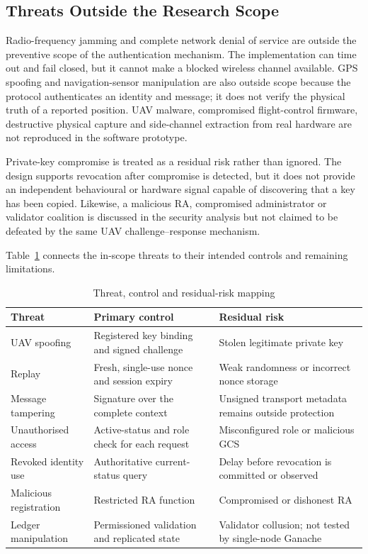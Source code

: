 \subsection{Threats Outside the Research Scope}
\label{subsec:out-of-scope-threats}

Radio-frequency jamming and complete network denial of service are outside the preventive scope of the authentication mechanism. The implementation can time out and fail closed, but it cannot make a blocked wireless channel available. GPS spoofing and navigation-sensor manipulation are also outside scope because the protocol authenticates an identity and message; it does not verify the physical truth of a reported position. UAV malware, compromised flight-control firmware, destructive physical capture and side-channel extraction from real hardware are not reproduced in the software prototype.

Private-key compromise is treated as a residual risk rather than ignored. The design supports revocation after compromise is detected, but it does not provide an independent behavioural or hardware signal capable of discovering that a key has been copied. Likewise, a malicious RA, compromised administrator or validator coalition is discussed in the security analysis but not claimed to be defeated by the same UAV challenge--response mechanism.

Table~\ref{tab:threat-control-map} connects the in-scope threats to their intended controls and remaining limitations.

\begin{table}[htbp]
    \centering
    \caption{Threat, control and residual-risk mapping}
    \label{tab:threat-control-map}
    \begin{tabular}{|p{}|p{}|p{}|}
        \hline
        \textbf{Threat} & \textbf{Primary control} & \textbf{Residual risk} \\
        \hline
        UAV spoofing & Registered key binding and signed challenge & Stolen legitimate private key \\
        \hline
        Replay & Fresh, single-use nonce and session expiry & Weak randomness or incorrect nonce storage \\
        \hline
        Message tampering & Signature over the complete context & Unsigned transport metadata remains outside protection \\
        \hline
        Unauthorised access & Active-status and role check for each request & Misconfigured role or malicious GCS \\
        \hline
        Revoked identity use & Authoritative current-status query & Delay before revocation is committed or observed \\
        \hline
        Malicious registration & Restricted RA function & Compromised or dishonest RA \\
        \hline
        Ledger manipulation & Permissioned validation and replicated state & Validator collusion; not tested by single-node Ganache \\
        \hline
    \end{tabular}
\end{table}

